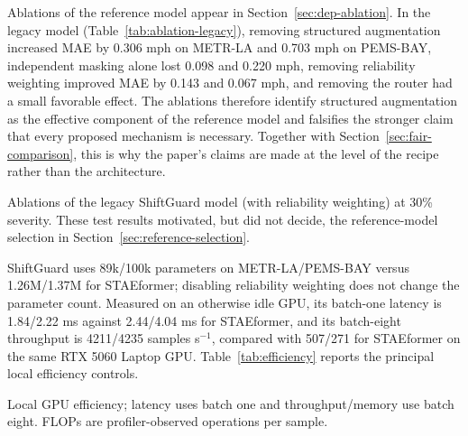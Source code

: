 \documentclass[preprint,12pt]{elsarticle}
\newcommand{\pending}[1]{\textcolor{red}{[PENDING: #1]}}
\begin{document}
Ablations of the reference model appear in Section~\ref{sec:dep-ablation}. In the
legacy model (Table~\ref{tab:ablation-legacy}),
removing structured augmentation increased MAE by 0.306 mph on METR-LA and 0.703
mph on PEMS-BAY, independent masking alone lost 0.098 and 0.220 mph, removing
reliability weighting improved MAE by 0.143 and 0.067 mph, and removing the
router had a small favorable effect. The ablations therefore identify structured augmentation as the
effective component of the reference model and falsifies the stronger claim
that every proposed mechanism is necessary. Together with
Section~\ref{sec:fair-comparison}, this is why the paper's claims are made at
the level of the recipe rather than the architecture.
\begin{table}[t]
  \centering
  \caption{Ablations of the legacy ShiftGuard model (with reliability
  weighting) at 30\% severity. These test results motivated, but did not
  decide, the reference-model selection in
  Section~\ref{sec:reference-selection}.}
  \label{tab:ablation-legacy}
  \IfFileExists{generated_ablation_legacy.tex}{%
    \resizebox{0.86\columnwidth}{!}{}}{%
    \pending{generated by scripts/aggregate\_results.py}}
\end{table}

ShiftGuard uses 89k/100k parameters on METR-LA/PEMS-BAY versus
1.26M/1.37M for STAEformer; disabling reliability weighting does not change
the parameter count. Measured on an otherwise idle GPU, its batch-one latency is
1.84/2.22 ms against 2.44/4.04 ms for STAEformer, and its batch-eight throughput is
4211/4235 samples s$^{-1}$, compared with 507/271 for STAEformer on the same RTX
5060 Laptop GPU. Table~\ref{tab:efficiency}
reports the principal local efficiency controls.
\begin{table}[!htbp]
  \centering
  \caption{Local GPU efficiency; latency uses batch one and throughput/memory
  use batch eight. FLOPs are profiler-observed operations per sample.}
  \label{tab:efficiency}
  \resizebox{0.90\columnwidth}{!}{}
\end{table}
\end{document}
